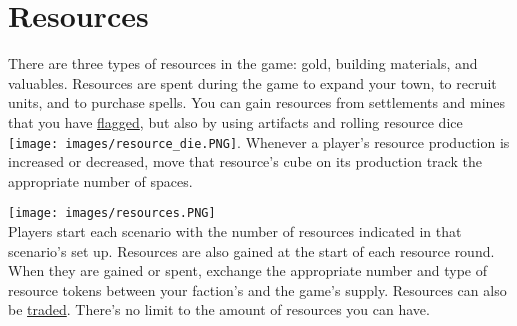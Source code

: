 \documentclass[12pt]{article}
\begin{document}
\clearpage
\section{Resources}
There are three types of resources in the game: gold, building materials, and valuables.
Resources are spent during the game to expand your town, to recruit units, and to purchase spells. You can gain resources from settlements and mines that you have \hyperlink{Categories}{flagged}, but also by using artifacts and rolling resource dice \texttt{[image: images/resource\_die.PNG]}. Whenever a player's resource production is increased or decreased, move that resource's cube on its production track the appropriate number of spaces.\par
\texttt{[image: images/resources.PNG]}\\
Players start each scenario with the number of resources indicated in that scenario’s set up.
Resources are also gained at the start of each resource round. When they are gained or spent, exchange the appropriate number and type of resource tokens between your faction's and the game's supply. Resources can also be \hyperlink{Trading}{traded}. There's no limit to the amount of resources you can have.
\end{document}
